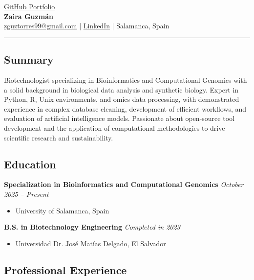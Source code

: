 \documentclass[a4paper,10pt]{article}
\begin{document}
\pagestyle{empty}

\begin{center}
  \href{https://github.com/zguztorres/Bioinformatics-Portfolio}{GitHub Portfolio} \\[0.5em]
  {\LARGE \bfseries Zaira Guzmán} \\[0.5em]
  \href{mailto:zguztorres99@gmail.com}{zguztorres99@gmail.com} \quad | \quad \href{https://www.linkedin.com/in/zaira-guzman/}{LinkedIn} \quad | \quad Salamanca, Spain
\end{center}

\hrule
\vspace{4pt}

\subsection*{Summary}
Biotechnologist specializing in Bioinformatics and Computational Genomics with a solid background in biological data analysis and synthetic biology. Expert in Python, R, Unix environments, and omics data processing, with demonstrated experience in complex database cleaning, development of efficient workflows, and evaluation of artificial intelligence models. Passionate about open-source tool development and the application of computational methodologies to drive scientific research and sustainability.

\subsection*{Education}

\textbf{Specialization in Bioinformatics and Computational Genomics} \hfill \textit{October 2025 – Present}
\begin{itemize}
    \item University of Salamanca, Spain
\end{itemize}

\textbf{B.S. in Biotechnology Engineering} \hfill \textit{Completed in 2023}
\begin{itemize}
    \item Universidad Dr. José Matías Delgado, El Salvador
\end{itemize}


\subsection*{Professional Experience}
\end{document}

